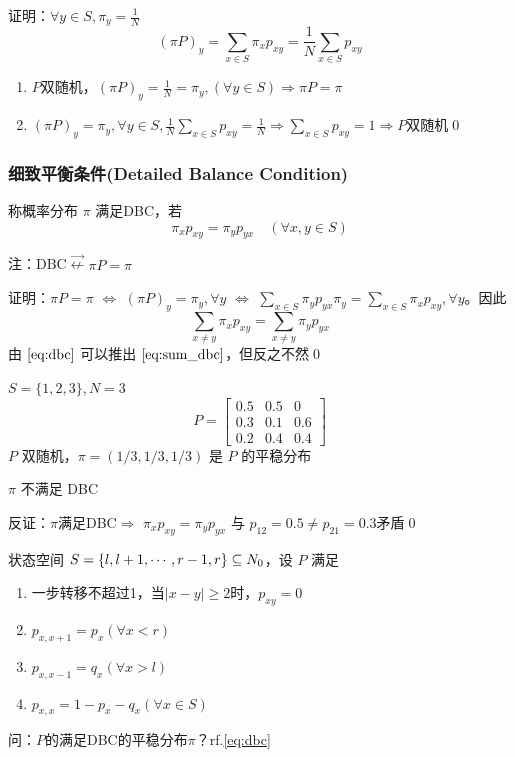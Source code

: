 证明：$\forall y\in S,\pi_y=\frac{1}{N}$
\[
(\pi P)_y=\sum_{x\in S}\pi_x p_{xy}=\frac{1}{N}\sum_{x\in S}p_{xy}
\]
\begin{enumerate}
    \item $P$双随机，$(\pi P)_y=\frac{1}{N}=\pi_y,(\forall y\in S)\Rightarrow \pi P=\pi$
    \item $(\pi P)_y=\pi_y,\forall y\in S,\frac{1}{N}\sum_{x\in S}p_{xy}=\frac{1}{N}\Rightarrow \sum_{x\in S}p_{xy}=1\Rightarrow P$双随机\qed
\end{enumerate}

\subsubsection{细致平衡条件(Detailed Balance Condition)}

\begin{definition}
    称概率分布 $\pi$ 满足DBC，若
    \begin{equation}
        \pi_xp_{xy}=\pi_y p_{yx}\quad (\forall x,y\in S)
    \label{eq:dbc}
    \end{equation}
\end{definition}

注：DBC$\stackrel{\rightarrow}{\nleftarrow} \pi P=\pi$

证明：$\pi P=\pi$ $\Leftrightarrow$ $ (\pi P)_y=\pi_y,\forall y$ $\Leftrightarrow$ $\sum_{x\in S}\pi_y p_{yx}\pi_y=\sum_{x\in S}\pi_x p_{xy},\forall y$。因此
\begin{equation}
    \sum_{x\neq y}\pi_x p_{xy}=\sum_{x\neq y}\pi_y p_{yx}
    \label{eq:sum_dbc}
\end{equation}
由 $\eqref{eq:dbc}$ 可以推出 $\eqref{eq:sum_dbc}$，但反之不然\qed

\begin{example}[DBC反例]
    $S=\{1,2,3\},N=3$
    \[
    P=\begin{bmatrix}
        0.5 & 0.5 & 0\\
        0.3 & 0.1 & 0.6\\
        0.2 & 0.4 & 0.4
    \end{bmatrix}
    \]
    $P$ 双随机，$\pi=(1/3,1/3,1/3)$ 是 $P$ 的平稳分布
    \begin{claim}
        $\pi$ 不满足 DBC
    \end{claim}
    反证：$\pi$满足DBC$\Rightarrow$ $\pi_x p_{xy}=\pi_y p_{yx}$ 与 $p_{12}=0.5\neq p_{21}=0.3$矛盾\qed
\end{example}

\begin{example}[生灭链]
    状态空间 $S=\{l,l+1,\cdots,r-1,r\}\subseteq N_0$，设 $P$ 满足
    \begin{enumerate}
        \item 一步转移不超过1，当$|x-y|\geq 2$时，$p_{xy}=0$
        \item $p_{x,x+1}=p_x(\forall x<r)$
        \item $p_{x,x-1}=q_x(\forall x>l)$
        \item $p_{x,x}=1-p_x-q_x(\forall x\in S)$
    \end{enumerate}
    问：$P$的满足DBC的平稳分布$\pi$？rf.\eqref{eq:dbc}
\end{example}

